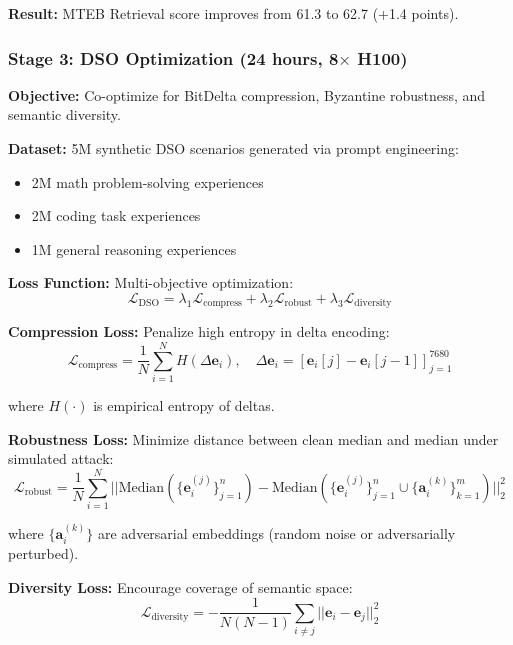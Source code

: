 \documentclass[11pt,a4paper]{article}
\begin{document}
\textbf{Result:} MTEB Retrieval score improves from 61.3 to 62.7 (+1.4 points).

\subsubsection{Stage 3: DSO Optimization (24 hours, 8$\times$ H100)}

\textbf{Objective:} Co-optimize for BitDelta compression, Byzantine robustness, and semantic diversity.

\textbf{Dataset:} 5M synthetic DSO scenarios generated via prompt engineering:
\begin{itemize}
\item 2M math problem-solving experiences
\item 2M coding task experiences  
\item 1M general reasoning experiences
\end{itemize}

\textbf{Loss Function:} Multi-objective optimization:
\begin{equation}
\mathcal{L}_{\text{DSO}} = \lambda_1 \mathcal{L}_{\text{compress}} + \lambda_2 \mathcal{L}_{\text{robust}} + \lambda_3 \mathcal{L}_{\text{diversity}}
\end{equation}

\textbf{Compression Loss:} Penalize high entropy in delta encoding:
\begin{equation}
\mathcal{L}_{\text{compress}} = \frac{1}{N} \sum_{i=1}^{N} H(\Delta \mathbf{e}_i), \quad \Delta \mathbf{e}_i = [\mathbf{e}_i[j] - \mathbf{e}_i[j-1]]_{j=1}^{7680}
\end{equation}

where $H(\cdot)$ is empirical entropy of deltas.

\textbf{Robustness Loss:} Minimize distance between clean median and median under simulated attack:
\begin{equation}
\mathcal{L}_{\text{robust}} = \frac{1}{N} \sum_{i=1}^{N} ||\text{Median}(\{\mathbf{e}_i^{(j)}\}_{j=1}^{n}) - \text{Median}(\{\mathbf{e}_i^{(j)}\}_{j=1}^{n} \cup \{\mathbf{a}_i^{(k)}\}_{k=1}^{m})||_2^2
\end{equation}

where $\{\mathbf{a}_i^{(k)}\}$ are adversarial embeddings (random noise or adversarially perturbed).

\textbf{Diversity Loss:} Encourage coverage of semantic space:
\begin{equation}
\mathcal{L}_{\text{diversity}} = -\frac{1}{N(N-1)} \sum_{i \neq j} ||\mathbf{e}_i - \mathbf{e}_j||_2^2
\end{equation}
\end{document}
